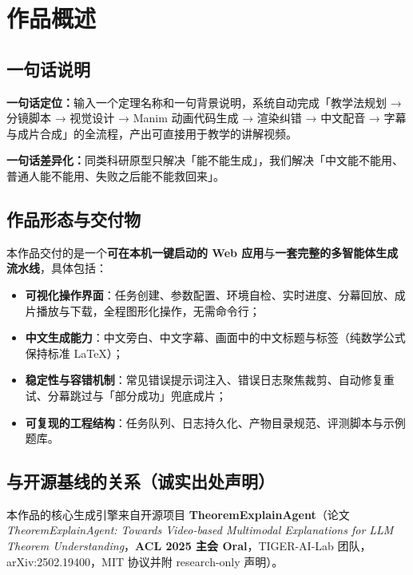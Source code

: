 \documentclass[11pt,a4paper]{ctexart}
\begin{document}
\clearpage

{\small
\renewcommand{\contentsname}{\color{teal}目\quad 录}
\tableofcontents
}
\clearpage

\section{作品概述}

\subsection{一句话说明}

\textbf{一句话定位：}输入一个定理名称和一句背景说明，系统自动完成「教学法规划 → 分镜脚本 → 视觉设计 → Manim 动画代码生成 → 渲染纠错 → 中文配音 → 字幕与成片合成」的全流程，产出可直接用于教学的讲解视频。

\textbf{一句话差异化：}同类科研原型只解决「能不能生成」，我们解决「中文能不能用、普通人能不能用、失败之后能不能救回来」。

\subsection{作品形态与交付物}

本作品交付的是一个\textbf{可在本机一键启动的 Web 应用}与\textbf{一套完整的多智能体生成流水线}，具体包括：

\begin{itemize}
  \item \textbf{可视化操作界面}：任务创建、参数配置、环境自检、实时进度、分幕回放、成片播放与下载，全程图形化操作，无需命令行；
  \item \textbf{中文生成能力}：中文旁白、中文字幕、画面中的中文标题与标签（纯数学公式保持标准 LaTeX）；
  \item \textbf{稳定性与容错机制}：常见错误提示词注入、错误日志聚焦裁剪、自动修复重试、分幕跳过与「部分成功」兜底成片；
  \item \textbf{可复现的工程结构}：任务队列、日志持久化、产物目录规范、评测脚本与示例题库。
\end{itemize}

\subsection{与开源基线的关系（诚实出处声明）}

本作品的核心生成引擎来自开源项目 \textbf{TheoremExplainAgent}（论文 \textit{TheoremExplainAgent: Towards Video-based Multimodal Explanations for LLM Theorem Understanding}，\textbf{ACL 2025 主会 Oral}，TIGER-AI-Lab 团队，arXiv:2502.19400，MIT 协议并附 research-only 声明）。
\end{document}

